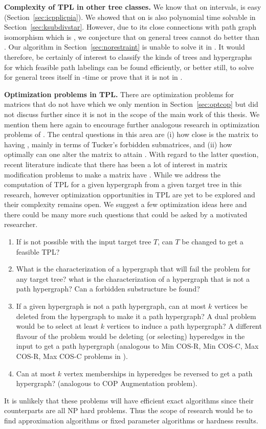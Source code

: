 \textbf{Complexity of TPL in other tree classes.}  We know that on
intervals, \CFTPL is easy (Section~\ref{sec:icpplicpia}).  We showed
that \CFTPL on {\kstar} is also polynomial time solvable in
Section~\ref{sec:ksubdivstar}. However, due to its close connections
with path graph isomorphism which is \gicomplete \cite{kklv10}, we
conjecture that \CFTPL on general trees cannot do better than
\gicomplete. Our algorithm in Section~\ref{sec:norestraint} is unable to
solve it in \p. It would therefore, be certainly of interest to
classify the kinds of trees and hypergraphs for which feasible path
labelings can be found efficiently, or better still, to solve \CFTPL
for general trees itself in \p-time or prove that it is not in \p.


\textbf{Optimization problems in TPL.}  There are optimization
problems for matrices that do not have \COP which we only mention in
Section~\ref{sec:optcop} but did not discuss further since it is not
in the scope of the main work of this thesis. We mention them here
again to encourage further analogous research in optimization problems
of \TPL.  The central questions in this area are (i) how close is the
matrix to having \COP, mainly in terms of Tucker's forbidden
submatrices, and (ii) how optimally can one alter the matrix to attain
\COP.  With regard to the latter question, recent literature indicate
that there has been a lot of interest in matrix modification problems
to make a matrix have \COP \cite{hg02, tz07}. While we address the
computation of TPL for a given hypergraph from a given target tree in
this research, however optimization opportunities in TPL are yet to be
explored and their complexity remains open. We suggest a few
optimization ideas here and there could be many more such questions
that could be asked by a motivated researcher. 
\begin{enumerate}
\item If \CFTPL is not possible with the input target tree $T$, 
  can $T$ be changed to get a feasible TPL?
\item What is the characterization of a hypergraph that will fail the
  \CFTPL problem for any target tree? \ie what is the characterization
  of a hypergraph that is not a path hypergraph? Can a forbidden
  substructure be found?
\item If a given hypergraph is not a path hypergraph, can at most $k$
  vertices be deleted from the hypergraph to make it a path
  hypergraph? A dual problem would be to select at least $k$ vertices
  to induce a path hypergraph? A different flavour of the problem
  would be deleting (or selecting) hyperedges in the input to get a
  path hypergraph (analogous to {\sc Min COS-R, Min COS-C, Max
    COS-R, Max COS-C} problems in \COP).
\item Can at most $k$ vertex memberships in hyperedges be
  reversed to get a path hypergraph? (analogous to {\sc COP
    Augmentation} problem).
\end{enumerate}
It is unlikely that these problems will have efficient exact
algorithms since their \COP counterparts are all NP hard
problems. Thus the scope of research would be to find approximation
algorithms or fixed parameter algorithms or hardness results.



